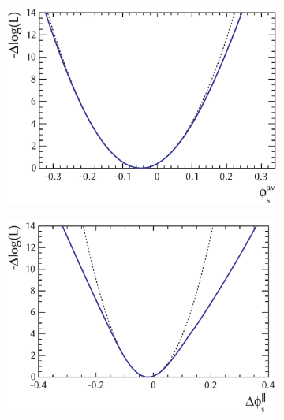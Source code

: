 \begin{figure}[tbp]
  \centering
  \begin{subfigure}{0.49\textwidth}
    \includegraphics[width=\textwidth]{graphics/results/NLL_polarDep_phiCPAv}
    \caption{}
  \end{subfigure}
  \hfill%
  \begin{subfigure}{0.49\textwidth}
    \includegraphics[width=\textwidth]{graphics/results/NLL_polarDep_phiCPRel_Apar}
    \caption{}
  \end{subfigure}


\end{figure}
